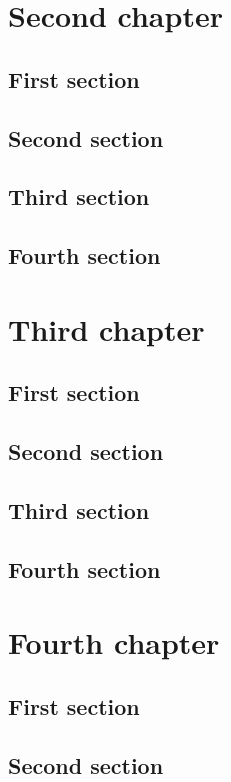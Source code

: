 \documentclass{researchbook}
\begin{document}
\chapter{Second chapter}

\section{First section}\lipsum
\section{Second section}\lipsum
\section{Third section}\lipsum
\section{Fourth section}\lipsum


\chapter{Third chapter}

\section{First section}\lipsum
\section{Second section}\lipsum
\section{Third section}\lipsum
\section{Fourth section}\lipsum


\chapter{Fourth chapter}

\section{First section}\lipsum
\section{Second section}\lipsum
\end{document}
